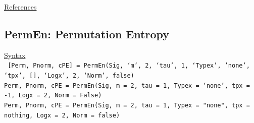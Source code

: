 \documentclass[12pt, a4paper, titlepage, openany]{book}
\begin{document}
\noindent \ul{References}\hspace{1cm}
\cite{K21} \cite{K22}



\newpage
\subsection{\normalsize PermEn: \hspace{15mm}  Permutation Entropy}
\noindent\ul{Syntax} \vspace{6mm} \\ \noindent \texttt{\footnotesize
[Perm, Pnorm, cPE] = PermEn(Sig, ‘m’, 2, ‘tau’, 1, ‘Typex’, ’none’, ‘tpx’, [], ‘Logx’, 2, ‘Norm’, false)\\
Perm, Pnorm, cPE  = PermEn(Sig, m = 2, tau = 1, Typex = ‘none’, tpx = -1, Logx = 2, Norm = False)\\ 
Perm, Pnorm, cPE  = PermEn(Sig, m = 2, tau = 1, Typex = "none", tpx = nothing, Logx = 2, Norm = false) }
\end{document}
